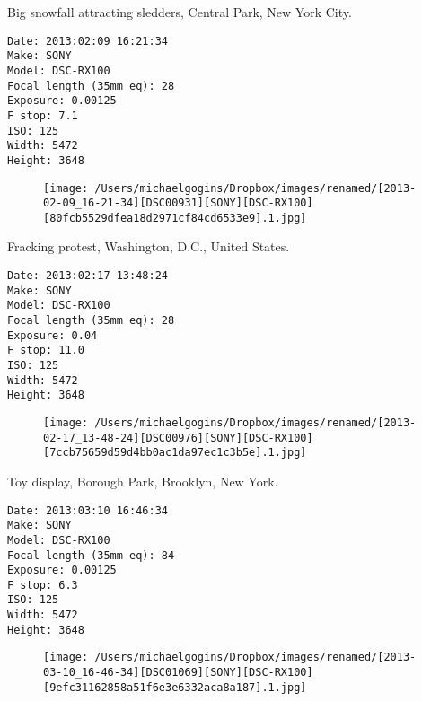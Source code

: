 \documentclass[11pt,letter,DIV=14,paper=landscape]{scrbook}
\begin{document}
\clearpage
\noindent Big snowfall attracting sledders, Central Park, New York City.
\noindent
\begin{lstlisting}
Date: 2013:02:09 16:21:34
Make: SONY
Model: DSC-RX100
Focal length (35mm eq): 28
Exposure: 0.00125
F stop: 7.1
ISO: 125
Width: 5472
Height: 3648
\end{lstlisting}
\clearpage

\begin{figure}
\texttt{[image: /Users/michaelgogins/Dropbox/images/renamed/[2013-02-09\_16-21-34][DSC00931][SONY][DSC-RX100][80fcb5529dfea18d2971cf84cd6533e9].1.jpg]}
\end{figure}
    
\clearpage
\noindent Fracking protest, Washington, D.C., United States.
\noindent
\begin{lstlisting}
Date: 2013:02:17 13:48:24
Make: SONY
Model: DSC-RX100
Focal length (35mm eq): 28
Exposure: 0.04
F stop: 11.0
ISO: 125
Width: 5472
Height: 3648
\end{lstlisting}
\clearpage

\begin{figure}
\texttt{[image: /Users/michaelgogins/Dropbox/images/renamed/[2013-02-17\_13-48-24][DSC00976][SONY][DSC-RX100][7ccb75659d59d4bb0ac1da97ec1c3b5e].1.jpg]}
\end{figure}
    
\clearpage
\noindent Toy display, Borough Park, Brooklyn, New York.
\noindent
\begin{lstlisting}
Date: 2013:03:10 16:46:34
Make: SONY
Model: DSC-RX100
Focal length (35mm eq): 84
Exposure: 0.00125
F stop: 6.3
ISO: 125
Width: 5472
Height: 3648
\end{lstlisting}
\clearpage

\begin{figure}
\texttt{[image: /Users/michaelgogins/Dropbox/images/renamed/[2013-03-10\_16-46-34][DSC01069][SONY][DSC-RX100][9efc31162858a51f6e3e6332aca8a187].1.jpg]}
\end{figure}
    
\end{document}
